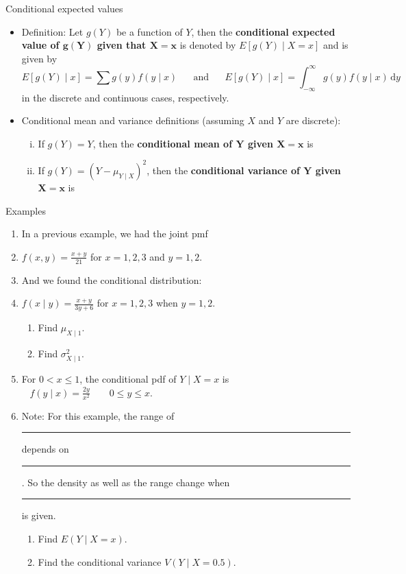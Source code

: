 \documentclass{article}
\newcommand{\blankul}[1]{\rule[-1.5mm]{#1}{0.15mm}}	%
\newcommand{\integral}[4]{\displaystyle \int_{#1}^{#2} #3 \,\mathrm{d} #4}		%
\begin{document}
Conditional expected values\bigskip
\begin{itemize}
    \item Definition: Let $g(Y)$ be a function of $Y$, then the \textbf{conditional expected value of $\boldsymbol{g(Y)}$ given that $\boldsymbol{X = x}$} is denoted by $E[g(Y) \mid X = x]$ and is given by 
    \[E[g(Y) \mid x ] = \sum g(y) f(y \mid x) \hspace{20pt} \text{and} \hspace{20pt} E[g(Y) \mid x] = \integral{-\infty}{\infty}{g(y) f(y \mid x)}{y}\]
    in the discrete and continuous cases, respectively.\bigskip
    \item Conditional mean and variance definitions (assuming $X$ and $Y$ are discrete):
    \begin{enumerate}[(i)]
        \item If $g(Y) = Y$, then the \textbf{conditional mean of $\boldsymbol{Y}$ given $\boldsymbol{X = x}$} is \vspace{40pt}
        \item If $g(Y) = (Y - \mu_{Y\mid X})^2$, then the \textbf{conditional variance of $\boldsymbol{Y}$ given $\boldsymbol{X = x}$} is\vspace{40pt}
    \end{enumerate}
\end{itemize}\bigskip

Examples\bigskip
\begin{enumerate}
    \item In a previous example, we had the joint pmf
    \item[] $\displaystyle f(x,y) = \frac{x + y}{21}$ \quad for $x = 1, 2, 3$ and $y = 1, 2$.\smallskip
    \item[] And we found the conditional distribution:
    \item[] $\displaystyle f(x \mid y) = \frac{x + y}{3y + 6}$ \quad for $x = 1, 2, 3$ when $y = 1, 2$.\smallskip
    \begin{enumerate}
        \item Find $\mu_{X \mid 1}$.\vspace{60pt}
        \item Find $\sigma_{X \mid 1}^2$.\vspace{100pt}
    \end{enumerate}
    \item For $0< x \le 1$, the conditional pdf of $Y \mid X = x$ is $\hspace{10pt}\displaystyle f(y \mid x) = \frac{2y}{x^2} \quad\quad 0 \le y \le x$.
    \item[] Note: For this example, the range of \blankul{1cm} depends on \blankul{1cm}. So the density as well as the range change when \blankul{2cm} is given.
    \begin{enumerate}
        \item Find $E(Y \mid X = x)$.\vspace{100pt}
        \item Find the conditional variance $V(Y \mid X = 0.5)$. \vspace{160pt}
    \end{enumerate}
\end{enumerate}\bigskip
\end{document}
